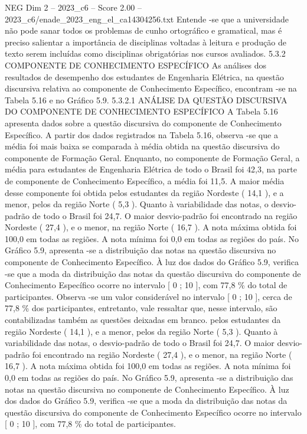 \begin{textsample}{NEG Dim 2 – 2023\_c6 – Score 2.00 – 2023\_c6/enade\_2023\_eng\_el\_ca14304256.txt}
Entende -se que a universidade não pode sanar todos os problemas de cunho ortográfico e gramatical, mas é preciso salientar a importância de disciplinas voltadas à leitura e produção de texto serem incluídas como disciplinas obrigatórias nos cursos avaliados. 5.3.2 COMPONENTE DE CONHECIMENTO ESPECÍFICO As análises dos resultados de desempenho dos estudantes de Engenharia Elétrica, na questão discursiva relativa ao componente de Conhecimento Específico, encontram -se na Tabela 5.16 e no Gráfico 5.9. 5.3.2.1 ANÁLISE DA QUESTÃO DISCURSIVA DO COMPONENTE DE CONHECIMENTO ESPECÍFICO A Tabela 5.16 apresenta dados sobre a questão discursiva do componente de Conhecimento Específico.
A partir dos dados registrados na Tabela 5.16, observa -se que a média foi mais baixa se comparada à média obtida na questão discursiva do componente de Formação Geral.
Enquanto, no componente de Formação Geral, a média para estudantes de Engenharia Elétrica de todo o Brasil foi 42,3, na parte de componente de Conhecimento Específico, a média foi 11,5.
A maior média desse componente foi obtida pelos estudantes da região Nordeste ( 14,1 ), e a menor, pelos da região Norte ( 5,3 ).
Quanto à variabilidade das notas, o desvio-padrão de todo o Brasil foi 24,7.
O maior desvio-padrão foi encontrado na região Nordeste ( 27,4 ), e o menor, na região Norte ( 16,7 ).
A nota máxima obtida foi 100,0 em todas as regiões.
A nota mínima foi 0,0 em todas as regiões do país.
No Gráfico 5.9, apresenta -se a distribuição das notas na questão discursiva no componente de Conhecimento Específico.
À luz dos dados do Gráfico 5.9, verifica -se que a moda da distribuição das notas da questão discursiva do componente de Conhecimento Específico ocorre no intervalo [ 0 ; 10 ], com 77,8 \% do total de participantes.
Observa -se um valor considerável no intervalo [ 0 ; 10 ], cerca de 77,8 \% dos participantes, entretanto, vale ressaltar que, nesse intervalo, são contabilizadas também as questões deixadas em branco. pelos estudantes da região Nordeste ( 14,1 ), e a menor, pelos da região Norte ( 5,3 ).
Quanto à variabilidade das notas, o desvio-padrão de todo o Brasil foi 24,7.
O maior desvio-padrão foi encontrado na região Nordeste ( 27,4 ), e o menor, na região Norte ( 16,7 ).
A nota máxima obtida foi 100,0 em todas as regiões.
A nota mínima foi 0,0 em todas as regiões do país.
No Gráfico 5.9, apresenta -se a distribuição das notas na questão discursiva no componente de Conhecimento Específico.
À luz dos dados do Gráfico 5.9, verifica -se que a moda da distribuição das notas da questão discursiva do componente de Conhecimento Específico ocorre no intervalo [ 0 ; 10 ], com 77,8 \% do total de participantes.

\end{textsample}
